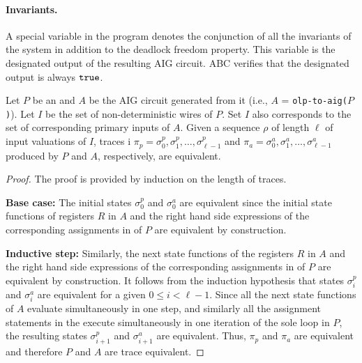 \paragraph{Invariants.}
%
A special variable in the \caig program denotes the conjunction of all the invariants of the system in addition to the deadlock freedom property. This variable is the designated output of the resulting 
AIG circuit. ABC verifies that the designated output is always $\mathtt{true}$. 
%
\begin{theorem}
Let $P$ be an \caig and $A$ be the AIG circuit generated from it (i.e., $A$ = \texttt{olp-to-aig($P$)}). 
Let $I$ be the set of non-deterministic wires of $P$. 
Set $I$ also corresponds to the set of corresponding primary 
inputs of $A$. 
Given a sequence $\rho$ of length $\ell$ 
of input valuations of $I$, traces i
$\pi_p=\sigma^p_{0}, \sigma^p_{1}, \ldots, \sigma^p_{\ell-1}$ 
and 
$\pi_a=\sigma^a_{0}, \sigma^a_{1}, \ldots, \sigma^a_{\ell-1}$ 
produced by $P$ and $A$, 
respectively, are equivalent. 
\end{theorem}


\begin{proof}
The proof is provided by induction on the length of traces. 

{\bf Base case:} 
The initial states $\sigma^p_{0}$ and 
$\sigma^a_{0}$ are equivalent since the 
initial state functions of registers $R$ in $A$ and 
the right hand side expressions of the corresponding
assignments in  of $P$ are equivalent
by construction. 

{\bf Inductive step:} 
Similarly, the next state functions of the registers $R$ in $A$ 
and the right hand side expressions of the corresponding
assignments in  of $P$ are equivalent
by construction. 
It follows from the induction hypothesis 
that states $\sigma^p_{i}$ and $\sigma^a_{i}$ are 
equivalent for a given $0\le i < \ell -1$.
Since all the next state functions of $A$ 
evaluate simultaneously in one step,
and similarly all the assignment statements in the 
 execute simultaneously in one iteration of the 
sole loop in $P$, 
the resulting states $\sigma^p_{i+1}$ and $\sigma^a_{i+1}$ 
are equivalent. 
Thus, $\pi_p$ and $\pi_a$ are equivalent and therefore 
$P$ and $A$ are trace equivalent. 
\end{proof}

%

